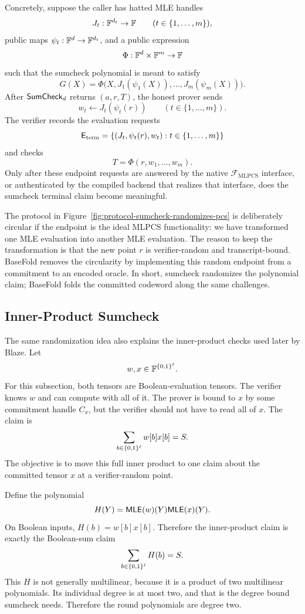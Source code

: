 Concretely, suppose the caller has hatted MLE handles
\[
  J_t:\mathbb{F}^{d_t}\to\mathbb{F}\qquad(t\in\{1,\ldots,m\}),
\]
public maps \(\psi_t:\mathbb{F}^d\to\mathbb{F}^{d_t}\), and a public expression
\[
  \Phi:\mathbb{F}^d\times\mathbb{F}^m\to\mathbb{F}
\]
such that the sumcheck polynomial is meant to satisfy
\[
  G(X)=
  \Phi\bigl(X,J_1(\psi_1(X)),\ldots,J_m(\psi_m(X))\bigr).
\]
After \(\mathsf{SumCheck}_d\) returns \((a,r,T)\), the honest prover sends
\[
  w_t\gets J_t(\psi_t(r))\qquad(t\in\{1,\ldots,m\}).
\]
The verifier records the evaluation requests
\[
  \mathsf{E}_{\mathrm{term}}
  =
  \{(J_t,\psi_t(r),w_t):t\in\{1,\ldots,m\}\}
\]
and checks
\[
  T=\Phi(r,w_1,\ldots,w_m).
\]
Only after these endpoint requests are answered by the native
\(\mathcal F_{\mathrm{MLPCS}}\) interface, or authenticated by the compiled
backend that realizes that interface, does the sumcheck terminal claim become
meaningful.

The protocol in Figure~\ref{fig:protocol-sumcheck-randomizes-pcs} is
deliberately circular if the endpoint is the ideal MLPCS functionality: we have
transformed one MLE evaluation into another MLE evaluation.  The reason to keep
the transformation is that the new point \(r\) is verifier-random and
transcript-bound.  BaseFold removes the circularity by implementing this random
endpoint from a commitment to an encoded oracle.  In short, sumcheck randomizes
the polynomial claim; BaseFold folds the committed codeword along the same
challenges.

\subsection{Inner-Product Sumcheck}

The same randomization idea also explains the inner-product checks used later by
Blaze.  Let
\[
  w,x\in\mathbb{F}^{\{0,1\}^\ell}.
\]
For this subsection, both tensors are Boolean-evaluation tensors.  The verifier
knows $w$ and can compute with all of it.  The prover is bound to $x$ by some
commitment handle $C_x$, but the verifier should not have to read all of $x$.
The claim is
\[
  \sum_{b\in\{0,1\}^\ell} w[b]x[b]=S.
\]
The objective is to move this full inner product to one claim about the
committed tensor $x$ at a verifier-random point.

Define the polynomial
\[
  H(Y)=\mathsf{MLE}(w)(Y)\mathsf{MLE}(x)(Y).
\]
On Boolean inputs, $H(b)=w[b]x[b]$.  Therefore the inner-product claim is
exactly the Boolean-sum claim
\[
  \sum_{b\in\{0,1\}^\ell}H(b)=S.
\]
This $H$ is not generally multilinear, because it is a product of two
multilinear polynomials.  Its individual degree is at most two, and that is the
degree bound sumcheck needs.  Therefore the round polynomials are degree two.

